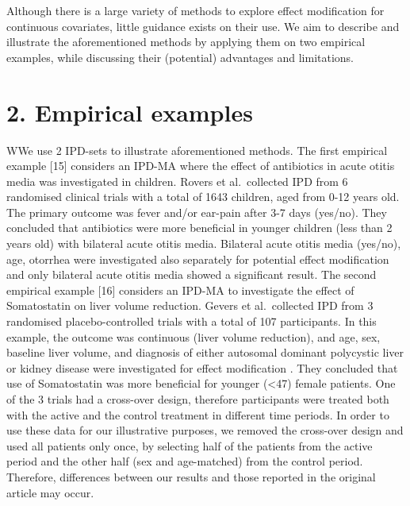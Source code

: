 \documentclass[14pt,]{article}
\begin{document}
\par

Although there is a large variety of methods to explore effect
modification for continuous covariates, little guidance exists on their
use. We aim to describe and illustrate the aforementioned methods by
applying them on two empirical examples, while discussing their
(potential) advantages and limitations.

\hypertarget{empirical-examples}{%
\section{2. Empirical examples}\label{empirical-examples}}

\par

WWe use 2 IPD-sets to illustrate aforementioned methods. The first
empirical example {[}15{]} considers an IPD-MA where the effect of
antibiotics in acute otitis media was investigated in children. Rovers
et al.~collected IPD from 6 randomised clinical trials with a total of
1643 children, aged from 0-12 years old. The primary outcome was fever
and/or ear-pain after 3-7 days (yes/no). They concluded that antibiotics
were more beneficial in younger children (less than 2 years old) with
bilateral acute otitis media. Bilateral acute otitis media (yes/no),
age, otorrhea were investigated also separately for potential effect
modification and only bilateral acute otitis media showed a significant
result. The second empirical example {[}16{]} considers an IPD-MA to
investigate the effect of Somatostatin on liver volume reduction. Gevers
et al.~collected IPD from 3 randomised placebo-controlled trials with a
total of 107 participants. In this example, the outcome was continuous
(liver volume reduction), and age, sex, baseline liver volume, and
diagnosis of either autosomal dominant polycystic liver or kidney
disease were investigated for effect modification . They concluded that
use of Somatostatin was more beneficial for younger (\textless47) female
patients. One of the 3 trials had a cross-over design, therefore
participants were treated both with the active and the control treatment
in different time periods. In order to use these data for our
illustrative purposes, we removed the cross-over design and used all
patients only once, by selecting half of the patients from the active
period and the other half (sex and age-matched) from the control period.
Therefore, differences between our results and those reported in the
original article may occur.
\end{document}
